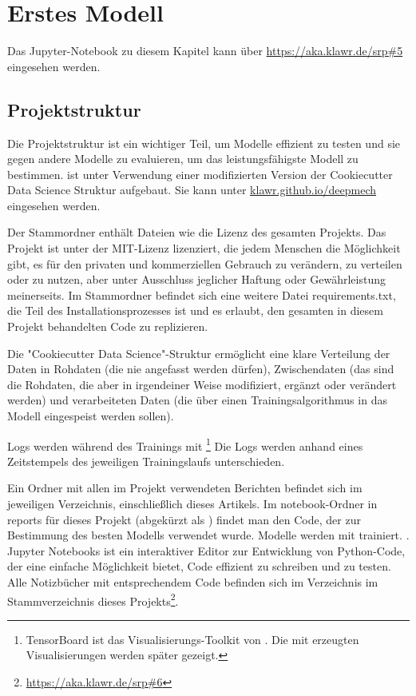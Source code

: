 \section{Erstes Modell}

Das Jupyter-Notebook zu diesem Kapitel kann über \url{https://aka.klawr.de/srp\#5} eingesehen werden.

\subsection{Projektstruktur}

Die Projektstruktur ist ein wichtiger Teil, um Modelle effizient zu testen und sie gegen andere Modelle zu evaluieren, um das leistungsfähigste Modell zu bestimmen.
 ist unter Verwendung einer modifizierten Version der Cookiecutter Data Science \cite{drivendata2019} Struktur aufgebaut. Sie kann unter \url{klawr.github.io/deepmech} eingesehen werden.

Der Stammordner enthält Dateien wie die Lizenz des gesamten Projekts.
Das Projekt ist unter der MIT-Lizenz lizenziert, die jedem Menschen die Möglichkeit gibt, es für den privaten und kommerziellen Gebrauch zu verändern, zu verteilen oder zu nutzen, aber unter Ausschluss jeglicher Haftung oder Gewährleistung meinerseits.
Im Stammordner befindet sich eine weitere Datei requirements.txt, die Teil des Installationsprozesses ist und es erlaubt, den gesamten in diesem Projekt behandelten Code zu replizieren.

Die "Cookiecutter Data Science"-Struktur ermöglicht eine klare Verteilung der Daten in Rohdaten (die nie angefasst werden dürfen), Zwischendaten (das sind die Rohdaten, die aber in irgendeiner Weise modifiziert, ergänzt oder verändert werden) und verarbeiteten Daten (die über einen Trainingsalgorithmus in das Modell eingespeist werden sollen).

Logs werden während des Trainings mit \footnote{TensorBoard ist das Visualisierungs-Toolkit von . Die mit  erzeugten Visualisierungen werden später gezeigt.} Die Logs werden anhand eines Zeitstempels des jeweiligen Trainingslaufs unterschieden.


Ein Ordner mit allen im Projekt verwendeten Berichten befindet sich im jeweiligen Verzeichnis, einschließlich dieses Artikels.
Im notebook-Ordner in reports für dieses Projekt (abgekürzt als ) findet man den Code, der zur Bestimmung des besten Modells verwendet wurde.
Modelle werden mit  trainiert. \cite{Jupyter2019}. 
Jupyter Notebooks ist ein interaktiver Editor zur Entwicklung von Python-Code, der eine einfache Möglichkeit bietet, Code effizient zu schreiben und zu testen.
Alle Notizbücher mit entsprechendem Code befinden sich im Verzeichnis  im Stammverzeichnis dieses Projekts\footnote{\url{https://aka.klawr.de/srp\#6}}.

